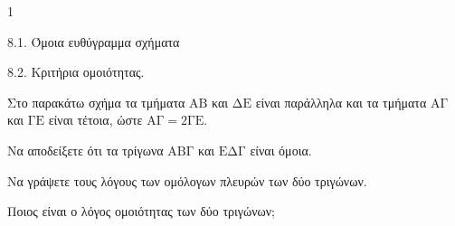\begin{ylh}{1}
    \item 8.1. Όμοια ευθύγραμμα σχήματα
    \item 8.2. Κριτήρια ομοιότητας.
\end{ylh}
\begin{figure}
    \centering
\end{figure}
Στο παρακάτω σχήμα τα τμήματα $\mathrm{AB}$ και $\mathrm{\Delta E}$ είναι παράλληλα και τα τμήματα $\mathrm{A\Gamma}$ και $\mathrm{\Gamma E}$ είναι τέτοια, ώστε $\mathrm{A\Gamma}=2\mathrm{\Gamma E}$.
\begin{alist}
\item Να αποδείξετε ότι τα τρίγωνα $\mathrm{AB\Gamma}$ και $\mathrm{E\Delta\Gamma}$ είναι όμοια. 
\item
    \begin{rlist}
    \item Να γράψετε τους λόγους των ομόλογων πλευρών των δύο τριγώνων.
    \item Ποιος είναι ο λόγος ομοιότητας των δύο τριγώνων;
    \end{rlist} 
\end{alist}